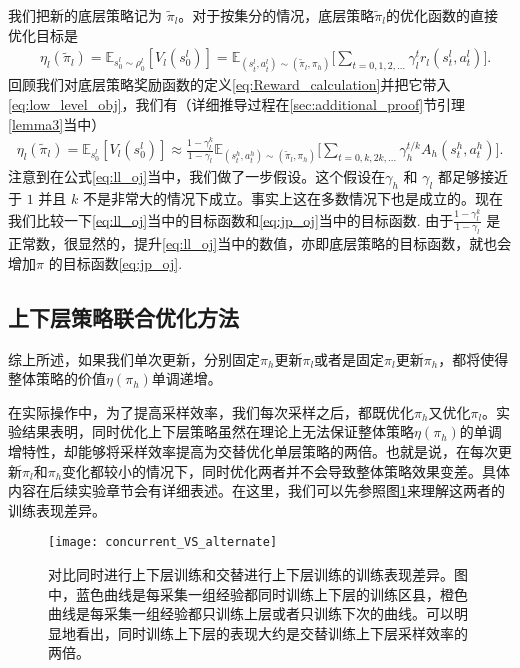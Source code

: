     我们把新的底层策略记为 $\tilde \pi_l$。对于按集分的情况，底层策略$\tilde\pi_l$的优化函数的直接优化目标是
    \begin{align}
        &\eta_l(\tilde\pi_l) = \mathbb{E}_{s_0^l \sim \rho_0^l}[V_l(s_0^l)] = \mathbb{E}_{(s^l_t, a^l_t)\sim(\tilde\pi_l,\pi_h)}\Bigg[\sum_{t = 0, 1, 2, ...} \gamma_l^{t} r_l(s_t^l, a_t^l)\Bigg].
        \label{eq:low_level_obj}
    \end{align}
    回顾我们对底层策略奖励函数的定义\eqref{eq:Reward_calculation}并把它带入\eqref{eq:low_level_obj}，我们有（详细推导过程在\ref{sec:additional_proof}节引理\ref{lemma3}当中）
    \begin{equation}\label{eq:ll_oj}
        \begin{aligned}
            \eta_l(\tilde\pi_l) = \mathbb{E}_{s_0^l}[V_l(s_0^l)] 
            \approx \frac{1-\gamma_l^k}{1-\gamma_l}\mathbb{E}_{(s_t^h, a_t^h)\sim(\tilde\pi_l,\pi_h)}\Bigg[\sum_{t=0,k,2k,...}\gamma_h^{t/k}A_h(s_t^h, a_t^h)\Bigg].
        \end{aligned}
    \end{equation} 
    注意到在公式\eqref{eq:ll_oj}当中，我们做了一步假设。这个假设在$\gamma_h$ 和 $\gamma_l$ 都足够接近于 $1$ 并且 $k$ 不是非常大的情况下成立。事实上这在多数情况下也是成立的。现在我们比较一下\eqref{eq:ll_oj}当中的目标函数和\eqref{eq:jp_oj}当中的目标函数. 由于$\frac{1-\gamma_l^k}{1-\gamma_l}$ 是正常数，很显然的，提升\eqref{eq:ll_oj}当中的数值，亦即底层策略的目标函数，就也会增加$\pi$ 的目标函数\eqref{eq:jp_oj}.

\subsection{上下层策略联合优化方法}
综上所述，如果我们单次更新，分别固定$\pi_h$更新$\pi_l$或者是固定$\pi_l$更新$\pi_h$，都将使得整体策略的价值$\eta(\pi_h)$单调递增。

在实际操作中，为了提高采样效率，我们每次采样之后，都既优化$\pi_h$又优化$\pi_l$。实验结果表明，同时优化上下层策略虽然在理论上无法保证整体策略$\eta(\pi_h)$的单调增特性，却能够将采样效率提高为交替优化单层策略的两倍。也就是说，在每次更新$\pi_l$和$\pi_h$变化都较小的情况下，同时优化两者并不会导致整体策略效果变差。具体内容在后续实验章节会有详细表述。在这里，我们可以先参照图\ref{fig:concurrent_VS_alternate}来理解这两者的训练表现差异。

      \begin{figure}[h] %
        \centering
        \texttt{[image: concurrent\_VS\_alternate]}
        \caption{对比同时进行上下层训练和交替进行上下层训练的训练表现差异。图中，蓝色曲线是每采集一组经验都同时训练上下层的训练区县，橙色曲线是每采集一组经验都只训练上层或者只训练下次的曲线。可以明显地看出，同时训练上下层的表现大约是交替训练上下层采样效率的两倍。}
        \label{fig:concurrent_VS_alternate}
      \end{figure}


